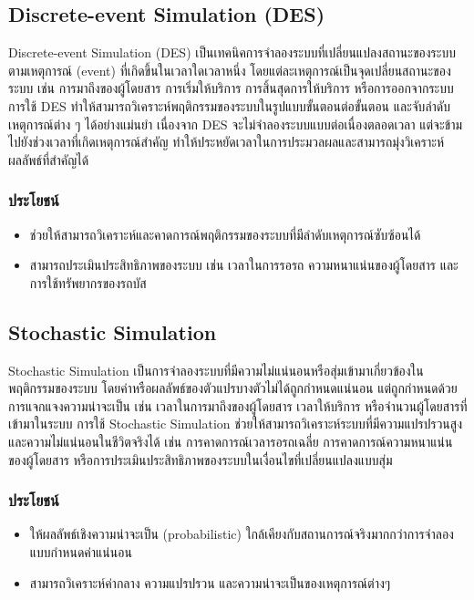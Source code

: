\subsection{Discrete-event Simulation (DES)}
Discrete-event Simulation (DES) เป็นเทคนิคการจำลองระบบที่เปลี่ยนแปลงสถานะของระบบตามเหตุการณ์ (event) 
ที่เกิดขึ้นในเวลาใดเวลาหนึ่ง โดยแต่ละเหตุการณ์เป็นจุดเปลี่ยนสถานะของระบบ 
เช่น การมาถึงของผู้โดยสาร การเริ่มให้บริการ การสิ้นสุดการให้บริการ หรือการออกจากระบบ 
การใช้ DES ทำให้สามารถวิเคราะห์พฤติกรรมของระบบในรูปแบบขั้นตอนต่อขั้นตอน 
และจับลำดับเหตุการณ์ต่าง ๆ ได้อย่างแม่นยำ เนื่องจาก DES จะไม่จำลองระบบแบบต่อเนื่องตลอดเวลา 
แต่จะข้ามไปยังช่วงเวลาที่เกิดเหตุการณ์สำคัญ ทำให้ประหยัดเวลาในการประมวลผลและสามารถมุ่งวิเคราะห์ผลลัพธ์ที่สำคัญได้

\subsubsection{ประโยชน์}
\begin{itemize}
  \item ช่วยให้สามารถวิเคราะห์และคาดการณ์พฤติกรรมของระบบที่มีลำดับเหตุการณ์ซับซ้อนได้
  \item สามารถประเมินประสิทธิภาพของระบบ เช่น เวลาในการรอรถ ความหนาแน่นของผู้โดยสาร และการใช้ทรัพยากรของรถบัส
\end{itemize}

\subsection{Stochastic Simulation}
Stochastic Simulation เป็นการจำลองระบบที่มีความไม่แน่นอนหรือสุ่มเข้ามาเกี่ยวข้องในพฤติกรรมของระบบ
 โดยค่าหรือผลลัพธ์ของตัวแปรบางตัวไม่ได้ถูกกำหนดแน่นอน 
 แต่ถูกกำหนดด้วยการแจกแจงความน่าจะเป็น เช่น เวลาในการมาถึงของผู้โดยสาร เวลาให้บริการ 
 หรือจำนวนผู้โดยสารที่เข้ามาในระบบ การใช้ Stochastic Simulation 
 ช่วยให้สามารถวิเคราะห์ระบบที่มีความแปรปรวนสูงและความไม่แน่นอนในชีวิตจริงได้ 
 เช่น การคาดการณ์เวลารอรถเฉลี่ย การคาดการณ์ความหนาแน่นของผู้โดยสาร 
 หรือการประเมินประสิทธิภาพของระบบในเงื่อนไขที่เปลี่ยนแปลงแบบสุ่ม

\subsubsection{ประโยชน์}
\begin{itemize}
  \item ให้ผลลัพธ์เชิงความน่าจะเป็น (probabilistic) ใกล้เคียงกับสถานการณ์จริงมากกว่าการจำลองแบบกำหนดค่าแน่นอน
  \item สามารถวิเคราะห์ค่ากลาง ความแปรปรวน และความน่าจะเป็นของเหตุการณ์ต่างๆ
\end{itemize}